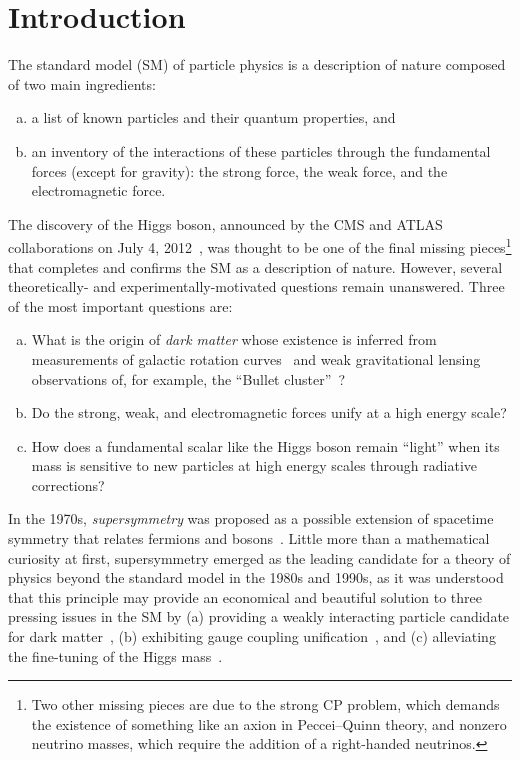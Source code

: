 \chapter{Introduction}
\label{ch:intro}

The standard model (SM) of particle physics is a description of nature
composed of two main ingredients:
\begin{enumerate}[(a)]
\item a list of known particles and their quantum properties, and
\item an inventory of the interactions of these particles through the fundamental forces
(except for gravity): the strong force, the weak force, and the electromagnetic
force. 
\end{enumerate}
The discovery of the Higgs boson, announced by the CMS and ATLAS
collaborations on July 4, 2012~\cite{CMShiggs,ATLAShiggs}, was
thought to be one of the final missing pieces\footnote{Two other missing
  pieces are due to the strong CP problem, which demands the existence of
  something like an axion in Peccei--Quinn theory, and nonzero neutrino masses, which require the addition of a right-handed neutrinos.} that completes and confirms the
SM as a description of nature. However, several theoretically- and
experimentally-motivated questions remain unanswered. Three
of the most important questions are:
\begin{enumerate}[(a)]
\item What is the origin of \emph{dark matter} whose existence is
  inferred from measurements of galactic rotation
  curves~\cite{1980ApJrotationcurves,1989HIrotationcurves} and weak gravitational lensing
  observations of, for example, the ``Bullet cluster''~\cite{Clowe:2006eq}?
\item Do the strong, weak, and electromagnetic
  forces unify at a high energy scale?
\item How does a fundamental scalar like the Higgs boson remain
  ``light'' when its mass is sensitive to new particles at high energy
  scales through radiative corrections?
\end{enumerate}

In the 1970s, \emph{supersymmetry} was proposed as a
possible extension of spacetime symmetry that relates fermions and
bosons~\cite{Ramond,Golfand,Volkov,Wess,Fayet}. Little
more than a mathematical curiosity at first, supersymmetry
emerged as the leading candidate for a theory of physics beyond the
standard model in the 1980s and 1990s, as it was understood that this 
principle may provide an economical and beautiful solution to
three pressing issues in the SM by (a) providing a weakly interacting particle candidate for dark
matter~\cite{Ellis:1983ew,Jungman:1995df}, (b) exhibiting gauge coupling
unification~\cite{Dimopoulos:1981yj,Marciano:1981un,Einhorn:1981sx,Ibanez:1981yh,Amaldi:1991cn,Langacker:1995fk},
and (c) alleviating the fine-tuning of the Higgs mass~\cite{Witten:1981nf,Dimopoulos:1981zb,Dine:1981za,Dimopoulos:1981au,Sakai:1981gr,Kaul:1981hi}.

